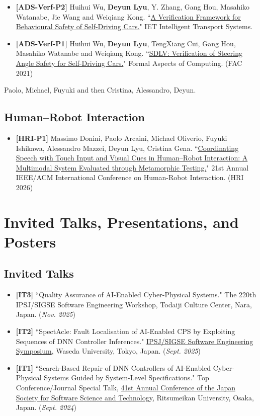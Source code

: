 \documentclass[11pt,a4paper]{moderncv}        %
\begin{document}
\begin{itemize}
    \item \textbf{[ADS-Verf-P2]} Huihui Wu, \textbf{Deyun Lyu}, Y. Zhang, Gang Hou, Masahiko Watanabe, Jie Wang and Weiqiang Kong. ``\href{https://ietresearch.onlinelibrary.wiley.com/doi/full/10.1049/itr2.12162}{A Verification Framework for Behavioural Safety of Self-Driving Cars.}" IET Intelligent Transport Systems.
    \item \textbf{[ADS-Verf-P1]} Huihui Wu, \textbf{Deyun Lyu}, TengXiang Cui, Gang Hou, Masahiko Watanabe and Weiqiang Kong. ``\href{https://link.springer.com/article/10.1007/s00165-021-00539-2}{SDLV: Verification of Steering Angle Safety for Self-Driving Cars.}" Formal Aspects of Computing. (FAC 2021)
\end{itemize}


Paolo, Michael, Fuyuki and then Cristina, Alessandro, Deyun.

\subsection{Human–Robot Interaction} 
\begin{itemize}
    \item \textbf{[HRI-P1]} Massimo Donini, Paolo Arcaini, Michael Oliverio, Fuyuki Ishikawa, Alessandro Mazzei, Deyun Lyu, Cristina Gena. ``\href{}{Coordinating Speech with Touch Input and Visual Cues in Human–Robot Interaction: A Multimodal System Evaluated through Metamorphic Testing.}" 21st Annual IEEE/ACM International Conference on Human-Robot Interaction. (HRI 2026)
\end{itemize}


\section{Invited Talks, Presentations, and Posters}

\subsection{Invited Talks}

\begin{itemize}
    \item \textbf{[IT3]} ``Quality Assurance of AI-Enabled Cyber-Physical Systems." The 220th IPSJ/SIGSE Software Engineering Workshop, Todaiji Culture Center, Nara, Japan. (\textit{Nov. 2025})
    \item \textbf{[IT2]} ``SpectAcle: Fault Localisation of AI-Enabled CPS by Exploiting Sequences of DNN Controller Inferences." \href{https://ses.sigse.jp/2025/program.html}{IPSJ/SIGSE Software Engineering Symposium}, Waseda University, Tokyo, Japan. (\textit{Sept. 2025})
    \item \textbf{[IT1]} ``Search-Based Repair of DNN Controllers of AI-Enabled Cyber-Physical Systems Guided by System-Level Specifications." Top Conference/Journal Special Talk, \href{https://jssst2024.wordpress.com/program/}{41st Annual Conference of the Japan Society for Software Science and Technology}, Ritsumeikan University, Osaka, Japan. (\textit{Sept. 2024})
\end{itemize}
\end{document}
